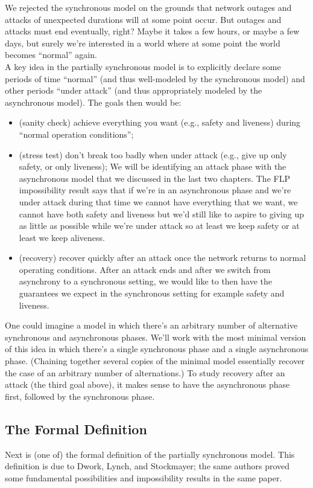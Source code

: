 We rejected the synchronous model on the grounds that network outages and attacks of
unexpected durations will at some point occur. But outages and attacks must end eventually,
right? Maybe it takes a few hours, or maybe a few days, but surely we’re interested in a
world where at some point the world becomes “normal” again.\\
A key idea in the partially synchronous model is to explicitly declare some periods of
time “normal” (and thus well-modeled by the synchronous model) and other periods “under
attack” (and thus appropriately modeled by the asynchronous model). The goals then would
be:
\begin{itemize}
    \item (sanity check) achieve everything you want (e.g., safety and liveness) during “normal
operation conditions”; 
    \item (stress test) don’t break too badly when under attack (e.g., give up only safety, or only
liveness); We will be identifying an attack phase with the asynchronous model that we discussed in the last two chapters. The FLP impossibility result says that if we're in an asynchronous phase and we're under attack during that time we cannot have everything that we want, we cannot have
both safety and liveness but we'd still like to aspire to giving up as little as possible while we're under attack so at
least we keep safety or at least we keep aliveness.
    \item (recovery) recover quickly after an attack once the network returns to normal operating
conditions. After an attack ends and after we switch from asynchrony to a synchronous setting, we would like to then have the guarantees we expect in the synchronous setting for example safety and liveness.
\end{itemize}

One could imagine a model in which there’s an arbitrary number of alternative synchronous and asynchronous phases. We’ll work with the most minimal version of this idea
in which there’s a single synchronous phase and a single asynchronous phase. (Chaining
together several copies of the minimal model essentially recover the case of an arbitrary
number of alternations.) To study recovery after an attack (the third goal above), it makes
sense to have the asynchronous phase first, followed by the synchronous phase.
\subsection{The Formal Definition}
Next is (one of) the formal definition of the partially synchronous model. This definition is
due to Dwork, Lynch, and Stockmayer; the same authors proved some fundamental
possibilities and impossibility results in the same paper.\\

